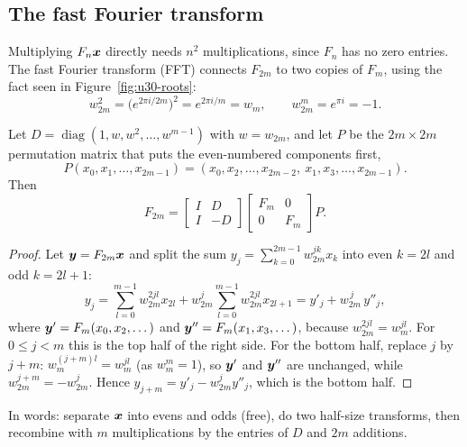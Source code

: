 \subsection{The fast Fourier transform}

Multiplying $F_n\boldsymbol{x}$ directly needs $n^2$ multiplications, since $F_n$ has no zero entries.
The fast Fourier transform (FFT) connects $F_{2m}$ to two copies of $F_m$, using the fact seen in
Figure~\ref{fig:u30-roots}:
\[
  w_{2m}^2=\bigl(e^{2\pi i/2m}\bigr)^2=e^{2\pi i/m}=w_m ,
  \qquad
  w_{2m}^m=e^{\pi i}=-1 .
\]

\begin{theorem}\label{thm:u30-fft}
Let $D=\operatorname{diag}(1,w,w^2,\dots,w^{m-1})$ with $w=w_{2m}$, and let $P$ be the
$2m\times 2m$ permutation matrix that puts the even-numbered components first,
\[
  P(x_0,x_1,\dots,x_{2m-1})=(x_0,x_2,\dots,x_{2m-2},\ x_1,x_3,\dots,x_{2m-1}).
\]
Then
\[
  F_{2m}=\begin{bmatrix}I&D\\I&-D\end{bmatrix}\begin{bmatrix}F_m&0\\0&F_m\end{bmatrix}P .
\]
\end{theorem}
\begin{proof}
Let $\boldsymbol{y}=F_{2m}\boldsymbol{x}$ and split the sum $y_j=\sum_{k=0}^{2m-1}w_{2m}^{jk}x_k$ into even $k=2l$ and
odd $k=2l+1$:
\[
  y_j=\sum_{l=0}^{m-1}w_{2m}^{2jl}x_{2l}+w_{2m}^{j}\sum_{l=0}^{m-1}w_{2m}^{2jl}x_{2l+1}
     =y'_j+w_{2m}^{\,j}\,y''_j ,
\]
where $\boldsymbol{y}'=F_m(x_0,x_2,\dots)$ and $\boldsymbol{y}''=F_m(x_1,x_3,\dots)$, because $w_{2m}^{2jl}=w_m^{jl}$. For
$0\le j<m$ this is the top half of the right side. For the bottom half, replace $j$ by $j+m$:
$w_m^{(j+m)l}=w_m^{jl}$ (as $w_m^m=1$), so $\boldsymbol{y}'$ and $\boldsymbol{y}''$ are unchanged, while
$w_{2m}^{j+m}=-w_{2m}^j$. Hence $y_{j+m}=y'_j-w_{2m}^jy''_j$, which is the bottom half.
\end{proof}

In words: separate $\boldsymbol{x}$ into evens and odds (free), do two half-size transforms, then
recombine with $m$ multiplications by the entries of $D$ and $2m$ additions.

